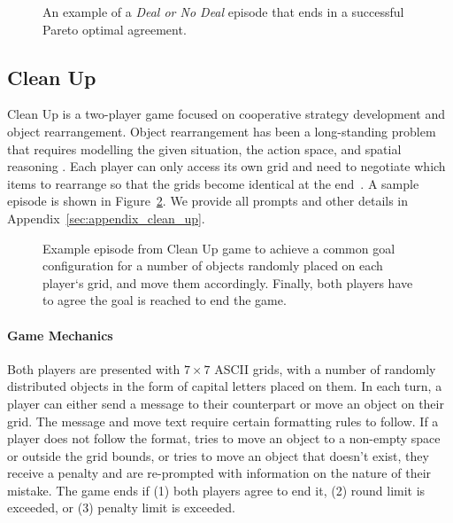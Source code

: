 \documentclass[11pt]{article}
\begin{document}
\begin{figure}[ht!]
  \centering
  
  \caption{An example of a \textit{Deal or No Deal} episode that ends in a successful Pareto optimal agreement.}
  \label{fig:dond_example}
  \vspace*{-.6cm}
\end{figure}

\subsection{Clean Up}

Clean Up is a two-player game focused on cooperative strategy development and object rearrangement. Object rearrangement has been a long-standing problem that requires modelling the given situation, the action space, and spatial reasoning \cite{DBLP:journals/corr/abs-2011-01975,DBLP:journals/ral/ZengWYZDCD24,DBLP:journals/access/KhanQCASR25}. Each player can only access its own grid and need to negotiate which items to rearrange so that the grids become identical at the end~\cite{DBLP:conf/sigdial/JeknicSK24}. A sample episode is shown in Figure~\ref{fig:clean_up_example}. We provide all prompts and other details in Appendix~\ref{sec:appendix_clean_up}.

\begin{figure}[ht!]
    \centering
    
    \caption{Example episode from Clean Up game to achieve a common goal configuration for a number of objects randomly placed on each player`s grid, and move them accordingly. Finally, both players have to agree the goal is reached to end the game.}
    \vspace*{-.6cm}
    \label{fig:clean_up_example}
\end{figure}

\paragraph{Game Mechanics} Both players are presented with $7\times7$ ASCII grids, with a number of randomly distributed objects in the form of capital letters placed on them. In each turn, a player can either send a message to their counterpart or move an object on their grid. The message and move text require certain formatting rules to follow. If a player does not follow the format, tries to move an object to a non-empty space or outside the grid bounds, or tries to move an object that doesn't exist, they receive a penalty and are re-prompted with information on the nature of their mistake. The game ends if (1) both players agree to end it, (2) round limit is exceeded, or (3) penalty limit is exceeded.
\end{document}
